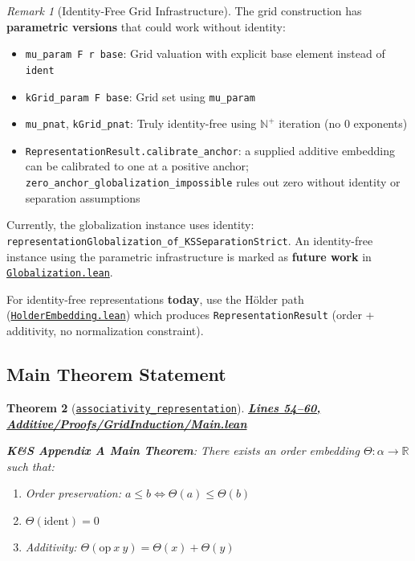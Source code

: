 \documentclass[11pt]{article}
\newtheorem{theorem}{Theorem}[section]
\theoremstyle{definition}
\theoremstyle{remark}
\newtheorem{remark}[theorem]{Remark}
\begin{document}
\begin{remark}[Identity-Free Grid Infrastructure]
The grid construction has \textbf{parametric versions} that could work without identity:
\begin{itemize}
\item \texttt{mu\_param F r base}: Grid valuation with explicit base element instead of \texttt{ident}
\item \texttt{kGrid\_param F base}: Grid set using \texttt{mu\_param}
\item \texttt{mu\_pnat}, \texttt{kGrid\_pnat}: Truly identity-free using $\mathbb{N}^+$ iteration (no 0 exponents)
\item \texttt{RepresentationResult.calibrate\_anchor}: a supplied additive embedding can be calibrated to one at a positive anchor; \texttt{zero\_anchor\_globalization\_impossible} rules out zero without identity or separation assumptions
\end{itemize}

Currently, the globalization instance uses identity:
\\
\texttt{representationGlobalization\_of\_KSSeparationStrict}.
An identity-free instance using the parametric infrastructure is marked as \textbf{future work} in \href{https://github.com/zariuq/ks-foundations-of-inference/blob/main/KnuthSkilling/Additive/Proofs/GridInduction/Globalization.lean}{\texttt{Globalization.lean}}.

For identity-free representations \textbf{today}, use the Hölder path (\href{https://github.com/zariuq/ks-foundations-of-inference/blob/main/KnuthSkilling/Additive/Proofs/OrderedSemigroupEmbedding/HolderEmbedding.lean}{\texttt{HolderEmbedding.lean}})
which produces \texttt{RepresentationResult} (order + additivity, no normalization constraint).
\end{remark}

\subsection{Main Theorem Statement}

\begin{theorem}[\href{https://github.com/zariuq/ks-foundations-of-inference/blob/main/KnuthSkilling/Additive/Proofs/GridInduction/Main.lean\#L54}{\texttt{associativity\_representation}}]
\textbf{\href{https://github.com/zariuq/ks-foundations-of-inference/blob/main/KnuthSkilling/Additive/Proofs/GridInduction/Main.lean\#L54-L60}{Lines 54--60, Additive/Proofs/GridInduction/Main.lean}}

\textbf{K\&S Appendix A Main Theorem}: There exists an order embedding $\Theta : \alpha \to \mathbb{R}$ such that:
\begin{enumerate}
\item Order preservation: $a \leq b \Leftrightarrow \Theta(a) \leq \Theta(b)$
\item $\Theta(\text{ident}) = 0$
\item Additivity: $\Theta(\text{op}\ x\ y) = \Theta(x) + \Theta(y)$
\end{enumerate}
\end{theorem}
\end{document}
